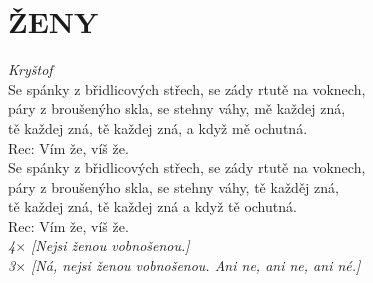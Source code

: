 \section*{\Huge ŽENY}
\emph{Kryštof}\\

Se spánky z břidlicových střech, \hspace{1cm} se zády rtutě na voknech, \\
páry z broušenýho skla, se stehny váhy, mě každej zná, \\
tě každej zná, tě každej zná, \hspace{1,5cm} a když mě ochutná.\\

Rec: Vím že, víš že.\\

Se spánky z břidlicových střech, se zády rtutě na voknech,\\
páry z broušenýho skla, se stehny váhy, tě každěj zná,\\
tě každej zná, tě každej zná a když tě ochutná.\\

Rec: Vím že, víš že.\\

\emph{4$\times$ [Nejsi ženou vobnošenou.]}\\

\emph{3$\times$ [Ná, nejsi ženou vobnošenou. Ani ne, ani ne, ani né.]}

\newpage
